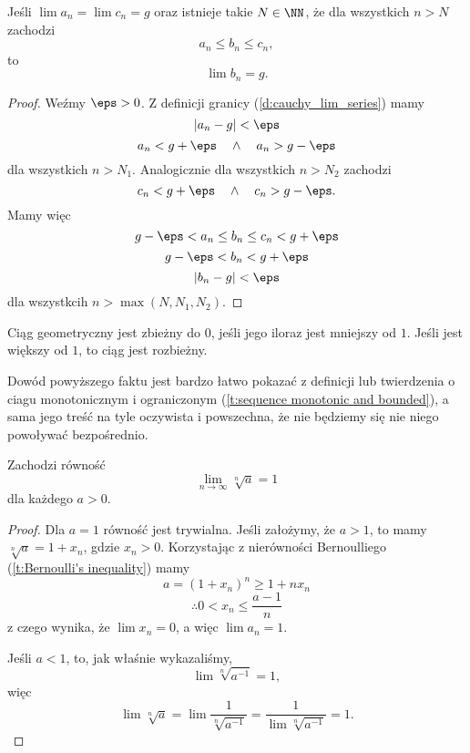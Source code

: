 \begin{theorem}
    \label{t:sequence squeeze theorem}
    Jeśli $\lim a_n = \lim c_n = g$ oraz istnieje takie $N \in \NN$, że dla wszystkich $n > N$ zachodzi
    \[ a_n \leq b_n \leq c_n, \]
    to
    \[ \lim b_n = g. \]
\end{theorem}
\begin{proof}
    Weźmy $\eps > 0$. Z definicji granicy (\ref{d:cauchy_lim_series}) mamy
    \[ |a_n - g| < \eps \]
    \[ a_n < g + \eps \quad\land\quad a_n > g - \eps \]
    dla wszystkich $n > N_1$.
    Analogicznie dla wszystkich $n > N_2$ zachodzi
    \[ c_n < g + \eps \quad\land\quad c_n > g - \eps. \]
    Mamy więc
    \[ g - \eps < a_n \leq b_n \leq c_n < g + \eps \]
    \[ g - \eps < b_n < g + \eps \]
    \[ |b_n - g| < \eps \]
    dla wszystkcih $n > \max(N, N_1, N_2)$.
\end{proof}

\begin{fact}
    Ciąg geometryczny jest zbieżny do $0$, jeśli jego iloraz jest mniejszy od $1$. Jeśli jest większy od $1$, to ciąg jest rozbieżny.
\end{fact}
Dowód powyższego faktu jest bardzo łatwo pokazać z definicji lub twierdzenia o ciagu monotonicznym i ograniczonym (\ref{t:sequence monotonic and bounded}), a sama jego treść na tyle oczywista i powszechna, że nie będziemy się nie niego powoływać bezpośrednio.

\begin{theorem}
    \label{t:(a)^(1/n)->1}
    Zachodzi równość
    \[ \lim_{n \to \infty}\sqrt[n]{a} = 1 \]
    dla każdego $a > 0$.
\end{theorem}
\begin{proof}
    Dla $a = 1$ równość jest trywialna. Jeśli założymy, że $a > 1$, to mamy $\sqrt[n]{a} = 1 + x_n$, gdzie $x_n > 0$. Korzystając z nierówności Bernoulliego (\ref{t:Bernoulli's inequality}) mamy
    \[ a = (1 + x_n)^n \geq 1 + nx_n \]
    \[ \therefore 0 < x_n \leq \frac{a - 1}{n} \]
    z czego wynika, że $\lim x_n = 0$, a więc $\lim a_n = 1$.

    Jeśli $a < 1$, to, jak właśnie wykazaliśmy,
    \[ \lim \sqrt[n]{a^{-1}} = 1, \]
    więc
    \[ \lim \sqrt[n]{a} = \lim \frac{1}{\sqrt[n]{a^{-1}}} = \frac{1}{\lim\sqrt[n]{a^{-1}}} = 1. \]
\end{proof}

